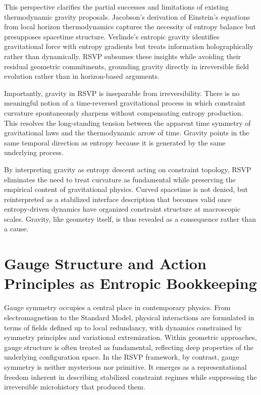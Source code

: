 \documentclass[11pt]{article}
\begin{document}
This perspective clarifies the partial successes and limitations of existing thermodynamic gravity proposals. Jacobson’s derivation of Einstein’s equations from local horizon thermodynamics captures the necessity of entropy balance but presupposes spacetime structure. Verlinde’s entropic gravity identifies gravitational force with entropy gradients but treats information holographically rather than dynamically. RSVP subsumes these insights while avoiding their residual geometric commitments, grounding gravity directly in irreversible field evolution rather than in horizon-based arguments.

Importantly, gravity in RSVP is inseparable from irreversibility. There is no meaningful notion of a time-reversed gravitational process in which constraint curvature spontaneously sharpens without compensating entropy production. This resolves the long-standing tension between the apparent time symmetry of gravitational laws and the thermodynamic arrow of time. Gravity points in the same temporal direction as entropy because it is generated by the same underlying process.

By interpreting gravity as entropy descent acting on constraint topology, RSVP eliminates the need to treat curvature as fundamental while preserving the empirical content of gravitational physics. Curved spacetime is not denied, but reinterpreted as a stabilized interface description that becomes valid once entropy-driven dynamics have organized constraint structure at macroscopic scales. Gravity, like geometry itself, is thus revealed as a consequence rather than a cause.

\section{Gauge Structure and Action Principles as Entropic Bookkeeping}

Gauge symmetry occupies a central place in contemporary physics. From electromagnetism to the Standard Model, physical interactions are formulated in terms of fields defined up to local redundancy, with dynamics constrained by symmetry principles and variational extremization. Within geometric approaches, gauge structure is often treated as fundamental, reflecting deep properties of the underlying configuration space. In the RSVP framework, by contrast, gauge symmetry is neither mysterious nor primitive. It emerges as a representational freedom inherent in describing stabilized constraint regimes while suppressing the irreversible microhistory that produced them.
\end{document}
